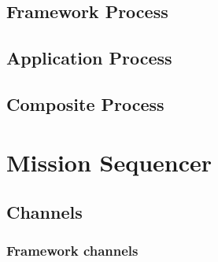 \documentclass{article}
\begin{document}
\begin{circusbox}

\end{circusbox}

\subsection{Framework Process}

\begin{circusbox}

\end{circusbox}

\subsection{Application Process}

\begin{circusbox}

\end{circusbox}

\subsection{Composite Process}

\begin{circusbox}

\end{circusbox}

\newpage


\section{Mission Sequencer}

\subsection{Channels}

\begin{circusbox}

\end{circusbox}

\subsubsection*{Framework channels}
\end{document}
